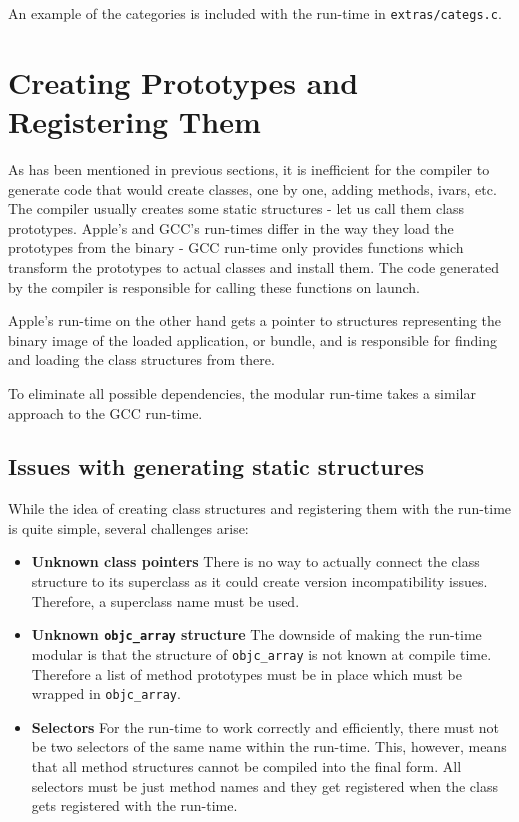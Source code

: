 An example of the categories is included with the run-time in \verb=extras/categs.c=.

\section{Creating Prototypes and Registering Them}

As has been mentioned in previous sections, it is inefficient for the compiler to generate code that would create classes, one by one, adding methods, ivars, etc. The compiler usually creates some static structures - let us call them class prototypes. Apple's and GCC's run-times differ in the way they load the prototypes from the binary - GCC run-time only provides functions which transform the prototypes to actual classes and install them. The code generated by the compiler is responsible for calling these functions on launch.

Apple's run-time on the other hand gets a pointer to structures representing the binary image of the loaded application, or bundle, and is responsible for finding and loading the class structures from there.

To eliminate all possible dependencies, the modular run-time takes a similar approach to the GCC run-time.

\subsection{Issues with generating static structures}

While the idea of creating class structures and registering them with the run-time is quite simple, several challenges arise:

\begin{itemize}
  \item{\bf{Unknown class pointers}} There is no way to actually connect the class structure to its superclass as it could create version incompatibility issues. Therefore, a superclass name must be used.
  \item{\bf{Unknown \verb=objc_array= structure}} The downside of making the run-time modular is that the structure of \verb=objc_array= is not known at compile time. Therefore a list of method prototypes must be in place which must be wrapped in \verb=objc_array=.
  \item{\bf{Selectors}} For the run-time to work correctly and efficiently, there must not be two selectors of the same name within the run-time. This, however, means that all method structures cannot be compiled into the final form. All selectors must be just method names and they get registered when the class gets registered with the run-time.
\end{itemize}

